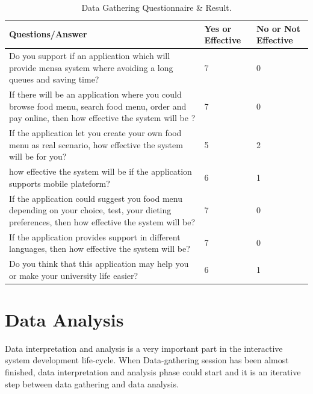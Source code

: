 \begin{table}[h!t]
\centering
 \begin{tabular}{| p{8.5cm} | p{2cm} | p{2cm} |}
    \hline
    Questions/Answer & Yes or Effective &  No or Not Effective\\ \hline
    
    Do you support if an application which will provide mensa system where avoiding
    a long queues and saving time? & 7  & 0 \\ \hline
    
    If there will be an application where you could browse food menu, search
    food menu, order and pay online, then how effective the system will be ? & 7
     & 0 \\ \hline
    
    If the application let you create your own food menu as real
    scenario, how effective the system will be for you? & 5 & 2 \\ \hline
    
    how effective the system will be if the application supports mobile
    plateform? & 6 & 1 \\ \hline
    
    If the application could suggest you food menu depending on your choice,
    test, your dieting preferences, then how effective the system will be?  &
    7 & 0 \\ \hline
    
    If the application provides support in different languages, then how
    effective the system will be? & 7 & 0 \\ \hline
    
	Do you think that this application may help you or make your university life
	easier?  & 6 & 1 \\ \hline	

\end{tabular}
 \caption{Data Gathering Questionnaire \& Result.}
\label{tab:DataGatheringQuestionnaire}
\end{table}


\section{Data Analysis}
\label{sec:DataAnalysis}
Data interpretation and analysis is a very important part in the interactive
system development life-cycle. When Data-gathering session has been almost
finished, data interpretation and analysis phase could start and it is an
iterative step between data gathering and data analysis.


